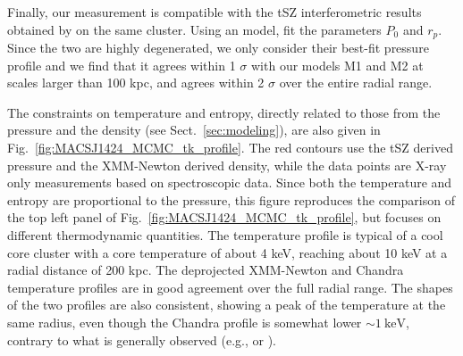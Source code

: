 \documentclass[traditabstract]{aa}
\begin{document}
Finally,  our measurement is compatible with the tSZ interferometric results obtained by \cite{bonamente2012} on the same cluster. Using an \cite{arnaud2010} model, \cite{bonamente2012} fit the parameters $P_0$ and $r_p$. Since the two are highly degenerated, we only consider their best-fit pressure profile and we find  that it agrees within 1 $\sigma$ with our models M1 and M2 at scales larger than 100 kpc, and agrees within 2 $\sigma$ over the entire radial range.

The constraints on temperature and entropy, directly related to those from the pressure and the density (see Sect.~\ref{sec:modeling}), are also given in Fig.~\ref{fig:MACSJ1424_MCMC_tk_profile}. The red contours use the tSZ derived pressure and the XMM-Newton derived density, while the data points are X-ray only  measurements based on spectroscopic data. Since both the temperature and entropy are proportional to the pressure, this figure reproduces the comparison of the top left panel of Fig.~\ref{fig:MACSJ1424_MCMC_tk_profile}, but focuses on different thermodynamic quantities. The temperature profile is typical of a cool core cluster with a core temperature of about 4 keV, reaching about 10 keV at a radial distance of 200 kpc. The deprojected XMM-Newton and Chandra temperature profiles are in good agreement over the full radial range. The shapes of the two profiles are also consistent, showing a peak of the temperature at the same radius, even though the Chandra profile is somewhat lower $\sim \SI{1}{\kilo\electronvolt}$, contrary to what is generally observed (e.g., \citealt{mahdavi2013} or \citealt{martino2014}).
\end{document}
